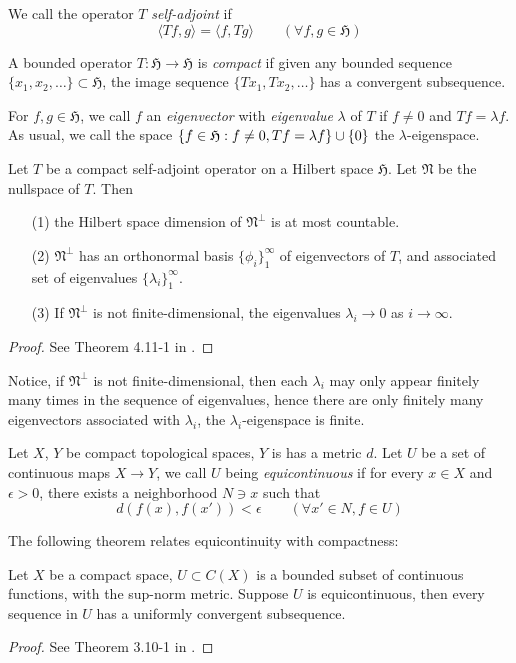 We call the operator $T$ \emph{self-adjoint} if
\[
  \langle T f, g \rangle = \langle f, T g \rangle \qquad (\forall f,g \in \mathfrak{H})
\]

A bounded operator $T : \mathfrak{H} \to \mathfrak{H}$ is \emph{compact} if
given any bounded sequence $\{x_1, x_2, \ldots\} \subset \mathfrak{H}$, the
image sequence $\{Tx_1, Tx_2, \ldots\}$ has a convergent subsequence.

For $f,g \in \mathfrak{H}$, we call $f$ an \emph{eigenvector} with
\emph{eigenvalue} $\lambda$ of $T$ if $f \neq 0$ and $Tf = \lambda f$. As usual,
we call the space $\left\{ f \in \mathfrak{H} : f \neq 0, Tf = \lambda f \right\} \cup \{0\}$ the
$\lambda$-eigenspace.

\begin{thm} \label{spectral}
  Let $T$ be a compact self-adjoint operator on a Hilbert space $\mathfrak{H}$.
  Let $\mathfrak{N}$ be the nullspace of $T$. Then
  \begin{enumerate}
    \item[(1)] the Hilbert space dimension of $\mathfrak{N}^{\perp}$ is at most countable.
    \item[(2)] $\mathfrak{N}^{\perp}$  has an orthonormal basis
      $\{\phi_i\}_1^{\infty}$ of eigenvectors of $T$, and associated set of
      eigenvalues $\{\lambda_i\}_1^{\infty}$.
    \item[(3)] If $\mathfrak{N}^{\perp}$ is not finite-dimensional, the
      eigenvalues $\lambda_i \to 0$ as $i \to \infty$.
  \end{enumerate}
\end{thm}

\begin{proof}
  See Theorem 4.11-1 in \cite{ciarlet2013linear}.
\end{proof}

Notice, if $\mathfrak{N}^{\perp}$ is not finite-dimensional, then each
$\lambda_i$ may only appear finitely many times in the sequence of eigenvalues,
hence there are only finitely many eigenvectors associated with $\lambda_i$, the
$\lambda_i$-eigenspace is finite.

Let $X$, $Y$ be compact topological spaces, $Y$ is has a metric $d$.  Let $U$ be
a set of continuous maps $X \to Y$, we call $U$ being \emph{equicontinuous} if
for every $x \in X$ and $\epsilon > 0$, there exists a neighborhood $N \ni x$
such that
\[
  d(f(x), f(x')) < \epsilon \qquad (\forall x' \in N, f \in U)
\]

The following theorem relates equicontinuity with compactness:

\begin{thm} \label{ascoli-arzela}
  Let $X$ be a compact space, $U \subset C(X)$ is a bounded subset of continuous
  functions, with the sup-norm metric. Suppose $U$ is equicontinuous, then every
  sequence in $U$ has a uniformly convergent subsequence.
\end{thm}

\begin{proof}
  See Theorem 3.10-1 in \cite{ciarlet2013linear}.
\end{proof}